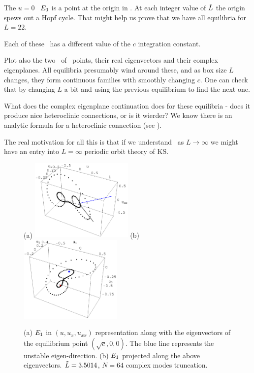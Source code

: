 The $u=0$  \eqv\ $E_{0}$ is a point at the origin
in .
At
each integer value of $\tilde{L}$ the origin spews out a Hopf cycle. That
might help us prove that we have all equilibria for $L=22$.

Each of these \eqva\ has a different value of the $c$ integration
constant.

Plot also the two \eqva\ of \eqva\ points, their
real eigenvectors and their complex eigenplanes. All equilibria presumably
wind around these, and as box size $L$ changes, they form continuous
families with smoothly changing $c$. One can check that by
changing $L$ a bit and using the previous equilibrium to find the next
one.

What does the complex eigenplane continuation does for these
equilibria - does it produce nice heteroclinic connections, or is it
wierder? We know there is an analytic formula for a heteroclinic
connection (see ). %

The real motivation for all this is that if we understand \eqva\ as
$L \to \infty$ we might have an entry into $L = \infty$ periodic orbit
theory of KS.

\begin{figure}[h]
\centering
(a) \includegraphics[width=5.0cm]{figs/1wSteadyE.eps}
\hspace{0.1in}
(b) \includegraphics[width=5.0cm]{figs/1wSteadyP.eps}
\caption{
\small{
(a) $E_{1}$ in $(u,u_x,u_{xx})$ representation along with the eigenvectors of the equilibrium
point $(\sqrt{c},0,0)$. The blue line represents the unstable eigen-direction.
(b) $E_{1}$ projected along the above eigenvectors. $\tilde{L}=3.5014$, $N=64$ complex modes truncation.
}
}
\label{f:1wSteady}
\end{figure}

